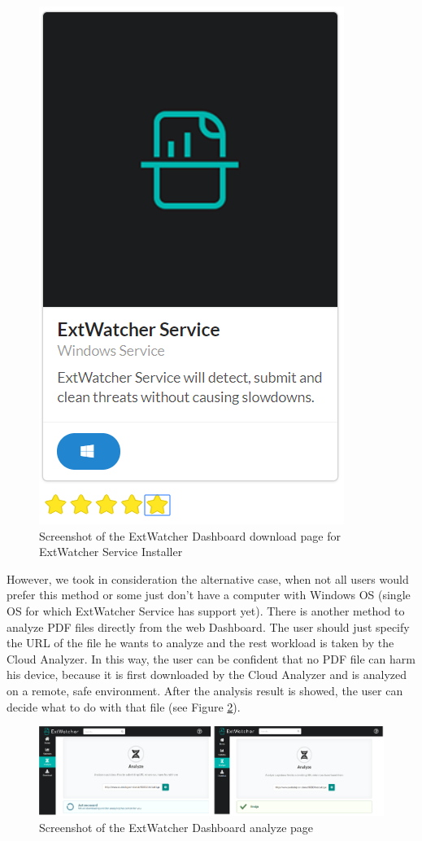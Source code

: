 \begin{figure}[H]
	\centerline{\includegraphics[scale=0.45]{figures/installer.png}}  
	\caption{Screenshot of the ExtWatcher Dashboard download page for ExtWatcher Service Installer}
	\label{screenshot:installer}
\end{figure}

However, we took in consideration the alternative case, when not all users would prefer this method or some just don't have a computer with Windows OS (single OS for which ExtWatcher Service has support yet). There is another method to analyze PDF files directly from the web Dashboard. The user should just specify the URL of the file he wants to analyze and the rest workload is taken by the Cloud Analyzer. In this way, the user can be confident that no PDF file can harm his device, because it is first downloaded by the Cloud Analyzer and is analyzed on a remote, safe environment. After the analysis result is showed, the user can decide what to do with that file (see Figure \ref{screenshot:analyze}).

\begin{figure}[H]
	\centerline{\includegraphics[scale=0.35]{figures/analyze.png}}  
	\caption{Screenshot of the ExtWatcher Dashboard analyze page}
	\label{screenshot:analyze}
\end{figure}